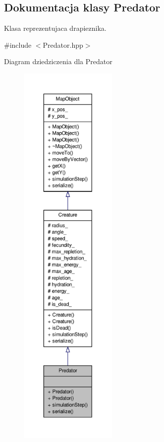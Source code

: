 \hypertarget{classPredator}{\subsection{Dokumentacja klasy Predator}
\label{classPredator}
}


Klasa reprezentujaca drapieznika.  




{\ttfamily \#include $<$Predator.\-hpp$>$}



Diagram dziedziczenia dla Predator
\nopagebreak
\begin{figure}[H]
\begin{center}
\leavevmode
\includegraphics[height=550pt]{classPredator__inherit__graph}
\end{center}
\end{figure}


